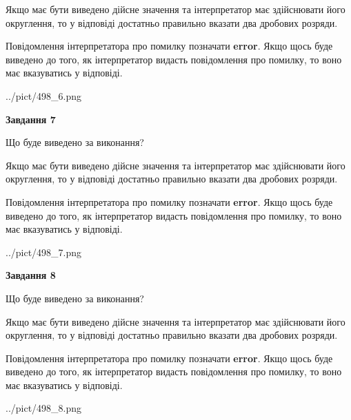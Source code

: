 \documentclass[12pt, ukrainian]{article}
\begin{document}
{\begin {Large}
Якщо має бути виведено дійсне значення та інтерпретатор має здійснювати його округлення, 
то у відповіді достатньо правильно вказати два дробових розряди.

Повідомлення інтерпретатора про помилку позначати \textbf{error}.
Якщо щось буде виведено до того, як інтерпретатор видасть повідомлення про помилку, 
то воно має вказуватись у відповіді. \par

\begin{center}
	{../pict/498_6.png}
\end{center}
\newpage

{\begin {center}\textbf{Завдання 7}\end {center}}\par
Що буде виведено за виконання? \par

Якщо має бути виведено дійсне значення та інтерпретатор має здійснювати його округлення, 
то у відповіді достатньо правильно вказати два дробових розряди.

Повідомлення інтерпретатора про помилку позначати \textbf{error}.
Якщо щось буде виведено до того, як інтерпретатор видасть повідомлення про помилку, 
то воно має вказуватись у відповіді. \par

\begin{center}
	{../pict/498_7.png}
\end{center}
\newpage

{\begin {center}\textbf{Завдання 8}\end {center}}\par
Що буде виведено за виконання? \par

Якщо має бути виведено дійсне значення та інтерпретатор має здійснювати його округлення, 
то у відповіді достатньо правильно вказати два дробових розряди.

Повідомлення інтерпретатора про помилку позначати \textbf{error}.
Якщо щось буде виведено до того, як інтерпретатор видасть повідомлення про помилку, 
то воно має вказуватись у відповіді. \par

\begin{center}
	{../pict/498_8.png}
\end{center}
\newpage


\end{Large}}
\end{document}

